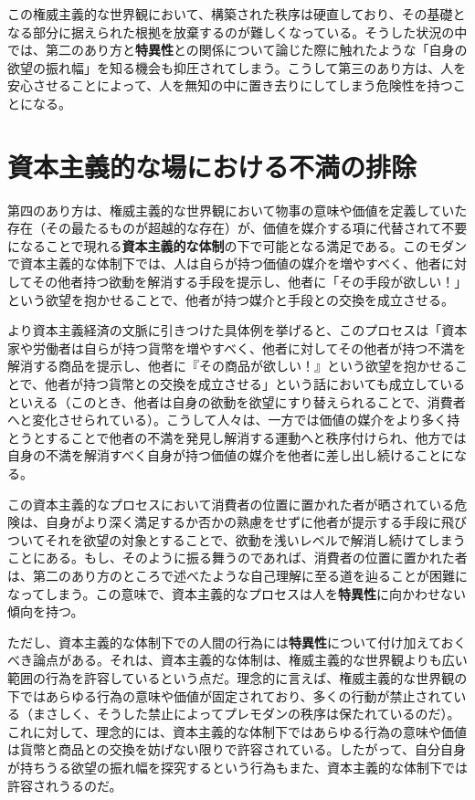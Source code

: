\documentclass[8pt, a5paper]{ltjsarticle}
\begin{document}
この権威主義的な世界観において、構築された秩序は硬直しており、その基礎となる部分に据えられた根拠を放棄するのが難しくなっている。そうした状況の中では、第二のあり方と\textbf{特異性}との関係について論じた際に触れたような「自身の欲望の振れ幅」を知る機会も抑圧されてしまう。こうして第三のあり方は、人を安心させることによって、人を無知の中に置き去りにしてしまう危険性を持つことになる。

\section{資本主義的な場における不満の排除}\label{ux8cc7ux672cux4e3bux7fa9ux7684ux306aux5834ux306bux304aux3051ux308bux4e0dux6e80ux306eux6392ux9664}

第四のあり方は、権威主義的な世界観において物事の意味や価値を定義していた存在（その最たるものが超越的な存在）が、価値を媒介する項に代替されて不要になることで現れる\textbf{資本主義的な体制}の下で可能となる満足である。このモダンで資本主義的な体制下では、人は自らが持つ価値の媒介を増やすべく、他者に対してその他者持つ欲動を解消する手段を提示し、他者に「その手段が欲しい！」という欲望を抱かせることで、他者が持つ媒介と手段との交換を成立させる。

より資本主義経済の文脈に引きつけた具体例を挙げると、このプロセスは「資本家や労働者は自らが持つ貨幣を増やすべく、他者に対してその他者が持つ不満を解消する商品を提示し、他者に『その商品が欲しい！』という欲望を抱かせることで、他者が持つ貨幣との交換を成立させる」という話においても成立しているといえる（このとき、他者は自身の欲動を欲望にすり替えられることで、消費者へと変化させられている）。こうして人々は、一方では価値の媒介をより多く持とうとすることで他者の不満を発見し解消する運動へと秩序付けられ、他方では自身の不満を解消すべく自身が持つ価値の媒介を他者に差し出し続けることになる。

この資本主義的なプロセスにおいて消費者の位置に置かれた者が晒されている危険は、自身がより深く満足するか否かの熟慮をせずに他者が提示する手段に飛びついてそれを欲望の対象とすることで、欲動を浅いレベルで解消し続けてしまうことにある。もし、そのように振る舞うのであれば、消費者の位置に置かれた者は、第二のあり方のところで述べたような自己理解に至る道を辿ることが困難になってしまう。この意味で、資本主義的なプロセスは人を\textbf{特異性}に向かわせない傾向を持つ。

ただし、資本主義的な体制下での人間の行為には\textbf{特異性}について付け加えておくべき論点がある。それは、資本主義的な体制は、権威主義的な世界観よりも広い範囲の行為を許容しているという点だ。理念的に言えば、権威主義的な世界観の下ではあらゆる行為の意味や価値が固定されており、多くの行動が禁止されている（まさしく、そうした禁止によってプレモダンの秩序は保たれているのだ）。これに対して、理念的には、資本主義的な体制下ではあらゆる行為の意味や価値は貨幣と商品との交換を妨げない限りで許容されている。したがって、自分自身が持ちうる欲望の振れ幅を探究するという行為もまた、資本主義的な体制下では許容されうるのだ。
\end{document}
